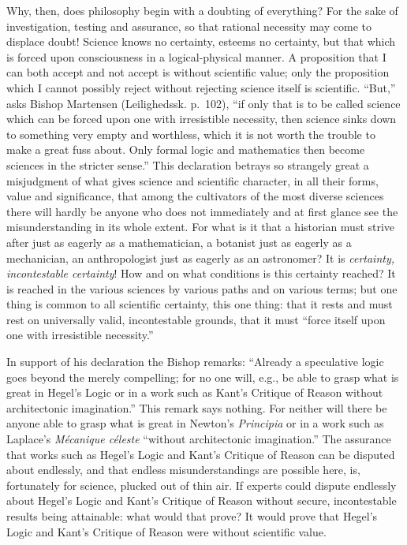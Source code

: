 \documentclass[12pt]{book}
\newcommand{\opage}[1]{\marginnote{\footnotesize\textit{[#1]}}}
\begin{document}
Why, then, does philosophy begin with a doubting of everything? For the sake of investigation, testing and assurance, so that rational necessity may come to displace doubt! Science knows no certainty, esteems no certainty, but that which is forced upon consciousness in a logical-physical manner. A proposition that I can both accept and not accept is without scientific value; only the proposition which I cannot possibly reject without rejecting science itself is scientific. ``But,'' asks Bishop Martensen (Leilighedssk. p.~102), ``if only that is to be called science which can be forced upon one with irresistible necessity, then science sinks down to something very empty and worthless, which it is not worth the trouble to make a great fuss about. Only formal logic and mathematics then become sciences in the stricter sense.'' This declaration betrays so strangely great a misjudgment of what gives science and scientific character, in all their forms, value and significance, that among the cultivators of the most diverse sciences there will hardly be anyone who does not immediately and at first glance see the misunderstanding in its whole extent. For what is it that a historian must strive after just as eagerly as a mathematician, a botanist just as eagerly as a mechanician, an anthropologist just as eagerly as an astronomer? It is \emph{certainty, incontestable certainty}! How and on what conditions is this certainty reached? It is reached in the various sciences by various paths and on various terms; but one thing is common to all scientific certainty, this one thing: that it rests and must rest on universally valid,
\opage{108}\setcounter{footnote}{0}%
incontestable grounds, that it must ``force itself upon one with irresistible necessity.''

In support of his declaration the Bishop remarks: ``Already a speculative logic goes beyond the merely compelling; for no one will, e.g., be able to grasp what is great in Hegel's Logic or in a work such as Kant's Critique of Reason without architectonic imagination.'' This remark says nothing. For neither will there be anyone able to grasp what is great in Newton's \textit{Principia} or in a work such as Laplace's \textit{Mécanique céleste} ``without architectonic imagination.'' The assurance that works such as Hegel's Logic and Kant's Critique of Reason can be disputed about endlessly, and that endless misunderstandings are possible here, is, fortunately for science, plucked out of thin air. If experts could dispute endlessly about Hegel's Logic and Kant's Critique of Reason without secure, incontestable results being attainable: what would that prove? It would prove that Hegel's Logic and Kant's Critique of Reason were without scientific value.
\end{document}
